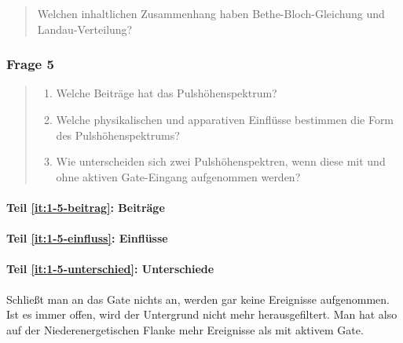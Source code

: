 \documentclass[11pt, ngerman, fleqn, DIV=15, headinclude, BCOR=2cm]{scrreprt}
\begin{document}
\begin{quote}
    Welchen inhaltlichen Zusammenhang haben Bethe-Bloch-Gleichung und
    Landau-Verteilung?
\end{quote}


\subsubsection{Frage 5}

\begin{quote}
    \begin{enumerate}
        \item
            \label{it:1-5-beitrag}
            Welche Beiträge hat das Pulshöhenspektrum?

        \item
            \label{it:1-5-einfluss}
            Welche physikalischen und apparativen Einflüsse bestimmen die Form
            des Pulshöhenspektrums?

        \item
            \label{it:1-5-unterschied}
            Wie unterscheiden sich zwei Pulshöhenspektren, wenn diese mit und
            ohne aktiven Gate-Eingang aufgenommen werden?
    \end{enumerate}
\end{quote}

\paragraph{Teil \ref{it:1-5-beitrag}: Beiträge}


\paragraph{Teil \ref{it:1-5-einfluss}: Einflüsse}


\paragraph{Teil \ref{it:1-5-unterschied}: Unterschiede}

Schließt man an das Gate nichts an, werden gar keine Ereignisse aufgenommen.
Ist es immer offen, wird der Untergrund nicht mehr herausgefiltert. Man hat
also auf der Niederenergetischen Flanke mehr Ereignisse als mit aktivem Gate.
\end{document}
